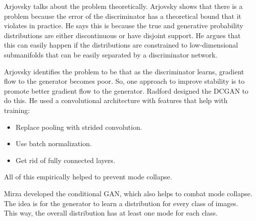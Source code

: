 \documentclass[11pt]{article}
\begin{document}
Arjovsky talks about the problem theoretically. Arjovsky shows that there is a problem because the error of the discriminator has a theoretical bound that it violates in practice. He says this is because the true and generative probability distributions are either discontinuous or have disjoint support. He argues that this can easily happen if the distributions are constrained to low-dimensional submanifolds that can be easily separated by a discriminator network.

Arjovsky identifies the problem to be that as the discriminator learns, gradient flow to the generator becomes poor. So, one approach to improve stability is to promote better gradient flow to the generator. Radford designed the DCGAN to do this. He used a convolutional architecture with features that help with training:
\begin{itemize}
\item Replace pooling with strided convolution.
\item Use batch normalization.
\item Get rid of fully connected layers.
\end{itemize}
All of this empirically helped to prevent mode collapse.

Mirza developed the conditional GAN, which also helps to combat mode collapse. The idea is for the generator to learn a distribution for every class of images. This way, the overall distribution has at least one mode for each class.
\end{document}
